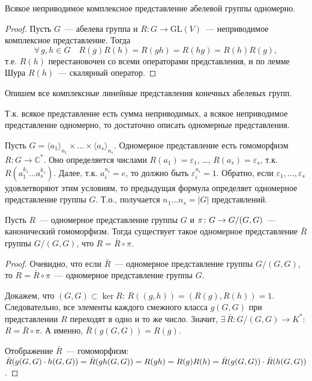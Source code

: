 \documentclass[a4paper]{article}
\newcommand*{\p}[1]{#1\nobreak\discretionary{}{\hbox{$\mathsurround=0pt #1$}}{}}
\begin{document}
\begin{sled}
Всякое неприводимое комплексное представление абелевой группы
одномерно.
\end{sled}

\begin{proof}
Пусть $G$~--- абелева группа и $R\colon G\to \mathrm{GL}(V)$~---
неприводимое комплексное представление. Тогда $$\forall \, g,h\in
G\quad R(g)R(h)=R(gh)=R(hg)=R(h)R(g),$$ т.е. $R(h)$ перестановочен
со всеми операторами представления, и по лемме Шура $R(h)$~---
скалярный оператор.
\end{proof}

Опишем все комплексные линейные представления конечных абелевых
групп.

Т.к. всякое представление есть сумма неприводимых, а всякое
неприводимое представление одномерно, то достаточно описать
одномерные представления.

Пусть $G=\langle a_1\rangle_{n_1}\times\ldots\times \langle
a_s\rangle_{n_s}$. Одномерное представление есть гомоморфизм
$R\colon G\to \mathbb{C}^*$. Оно определяется числами
$R(a_1)=\varepsilon_1$, \ldots, $R(a_s)=\varepsilon_s$, т.к.
$R(a_1^{k_1}\ldots a_s^{k_s})$. Далее, т.к. $a_i^{n_i}=e$, то должно
быть $\varepsilon_i^{n_i}=1$. Обратно, если
$\varepsilon_1,\ldots,\varepsilon_s$ удовлетворяют этим условиям, то
предыдущая формула определяет одномерное представление группы $G$.
Т.о., получается $n_1\ldots n_s=|G|$ представлений.

\begin{theorem}
Пусть $R$~--- одномерное представление группы $G$ и $\pi\colon
G\p\to G/(G,G)$~--- канонический гомоморфизм. Тогда существует такое
одномерное представление $\bar{R}$ группы $G/(G,G)$, что
$R=\bar{R}\circ\pi$.
\end{theorem}

\begin{proof}
Очевидно, что если $\bar{R}$~--- одномерное представление группы
$G/(G,G)$, то $R=\bar{R}\circ \pi$~--- одномерное представление
группы $G$.

Докажем, что $(G,G)\subset\ker R$: $R((g,h))=(R(g),R(h))=1$.
Следовательно, все элементы каждого смежного класса $g(G,G)$ при
представлении $R$ переходят в одно и то же число. Значит, $\exists
\, \bar{R}: G/(G,G)\to K^*$: $R=\bar{R}\circ\pi$. А именно,
$\bar{R}(g(G,G))=R(g)$.

Отображение $\bar{R}$~--- гомоморфизм: $\bar{R}(g(G,G)\cdot
h(G,G))=\bar{R}(gh(G,G))\p=R(gh)=R(g)R(h)=\bar{R}(g(G,G))\cdot
\bar{R}(h(G,G))$.
\end{proof}
\end{document}

